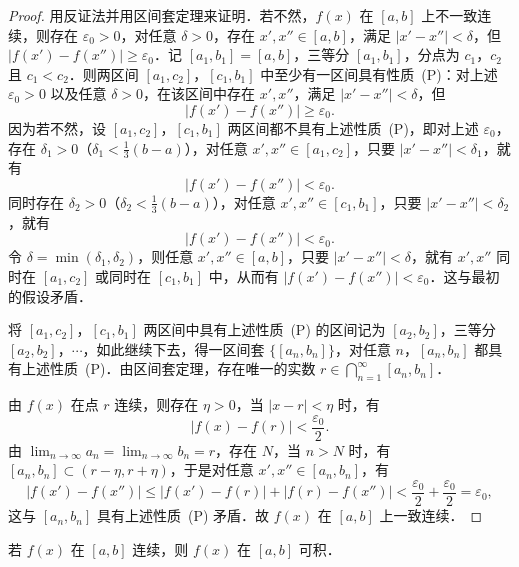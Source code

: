 \begin{proof}
用反证法并用区间套定理来证明．若不然，$f(x)$ 在 $[a,b]$ 上不一致连续，则存在 $\varepsilon_0 > 0$，对任意 $\delta > 0$，存在 $x', x'' \in [a,b]$，满足 $|x' - x''| < \delta$，但 $|f(x') - f(x'')| \geqslant \varepsilon_0$．记 $[a_1, b_1] = [a,b]$，三等分 $[a_1, b_1]$，分点为 $c_1$，$c_2$ 且 $c_1 < c_2$．则两区间 $[a_1, c_2]$，$[c_1, b_1]$ 中至少有一区间具有性质~(P)：对上述 $\varepsilon_0 > 0$ 以及任意 $\delta > 0$，在该区间中存在 $x', x''$，满足 $|x' - x''| < \delta$，但
\[
|f(x') - f(x'')| \geqslant \varepsilon_0.
\]
因为若不然，设 $[a_1, c_2]$，$[c_1, b_1]$ 两区间都不具有上述性质~(P)，即对上述 $\varepsilon_0$，存在 $\delta_1 > 0$（$\delta_1 < \frac{1}{3}(b - a)$），对任意 $x', x'' \in [a_1, c_2]$，只要 $|x' - x''| < \delta_1$，就有
\[
|f(x') - f(x'')| < \varepsilon_0.
\]
同时存在 $\delta_2 > 0$（$\delta_2 < \frac{1}{3}(b - a)$），对任意 $x', x'' \in [c_1, b_1]$，只要 $|x' - x''| < \delta_2$，就有
\[
|f(x') - f(x'')| < \varepsilon_0.
\]
令 $\delta = \min(\delta_1, \delta_2)$，则任意 $x', x'' \in [a,b]$，只要 $|x' - x''| < \delta$，就有 $x', x''$ 同时在 $[a_1, c_2]$ 或同时在 $[c_1, b_1]$ 中，从而有 $|f(x') - f(x'')| < \varepsilon_0$．这与最初的假设矛盾．

将 $[a_1, c_2]$，$[c_1, b_1]$ 两区间中具有上述性质~(P) 的区间记为 $[a_2, b_2]$，三等分 $[a_2, b_2]$，$\cdots$，如此继续下去，得一区间套 $\{[a_n, b_n]\}$，对任意 $n$，$[a_n, b_n]$ 都具有上述性质~(P)．由区间套定理，存在唯一的实数 $r \in \bigcap_{n=1}^\infty [a_n, b_n]$．

由 $f(x)$ 在点 $r$ 连续，则存在 $\eta > 0$，当 $|x - r| < \eta$ 时，有
\[
|f(x) - f(r)| < \frac{\varepsilon_0}{2}.
\]
由 $\lim_{n \to \infty} a_n = \lim_{n \to \infty} b_n = r$，存在 $N$，当 $n > N$ 时，有 $[a_n, b_n] \subset (r - \eta, r + \eta)$，于是对任意 $x', x'' \in [a_n, b_n]$，有
\[
|f(x') - f(x'')| \leqslant |f(x') - f(r)| + |f(r) - f(x'')| < \frac{\varepsilon_0}{2} + \frac{\varepsilon_0}{2} = \varepsilon_0,
\]
这与 $[a_n, b_n]$ 具有上述性质~(P) 矛盾．故 $f(x)$ 在 $[a,b]$ 上一致连续．
\end{proof}

\begin{theorem}\label{thm:7-7}
若 $f(x)$ 在 $[a,b]$ 连续，则 $f(x)$ 在 $[a,b]$ 可积．
\end{theorem}

